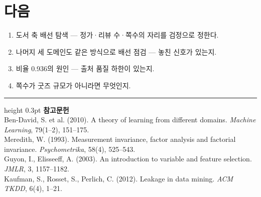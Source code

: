 \documentclass[10pt]{article}
\begin{document}
\section{다음}

\begin{enumerate}[leftmargin=1.3em,itemsep=0.15em]
\item 도서 축 배선 탐색 --- 정가·리뷰 수·쪽수의 자리를 검정으로 정한다.
\item 나머지 세 도메인도 같은 방식으로 배선 점검 --- 놓친 신호가 있는지.
\item 비율 0.936의 원인 --- 출처 품질 하한이 있는지.
\item 쪽수가 굿즈 규모가 아니라면 무엇인지.
\end{enumerate}

\vspace{0.6em}
\hrule height 0.3pt
\vspace{0.5em}
{\footnotesize
\textbf{참고문헌}\\[0.3em]
Ben-David, S. et al. (2010). A theory of learning from different domains.
\emph{Machine Learning}, 79(1--2), 151--175.\\[0.15em]
Meredith, W. (1993). Measurement invariance, factor analysis and factorial
invariance. \emph{Psychometrika}, 58(4), 525--543.\\[0.15em]
Guyon, I., Elisseeff, A. (2003). An introduction to variable and feature selection.
\emph{JMLR}, 3, 1157--1182.\\[0.15em]
Kaufman, S., Rosset, S., Perlich, C. (2012). Leakage in data mining.
\emph{ACM TKDD}, 6(4), 1--21.
}
\end{document}
